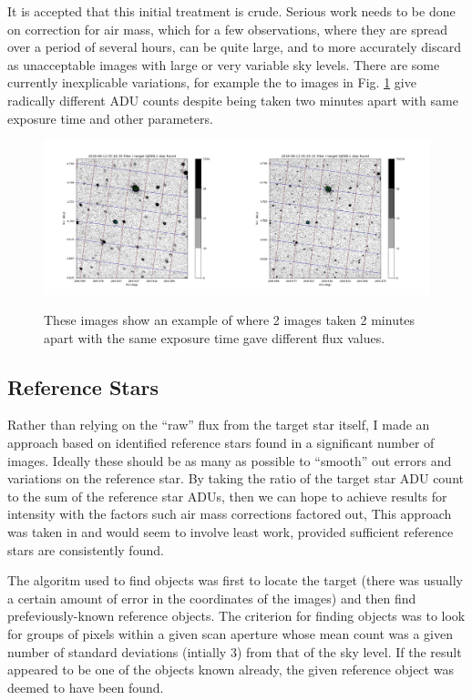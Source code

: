 It is accepted that this initial treatment is crude. Serious work needs to be done on correction for air mass,
which for a few observations, where they are spread over a period of several hours,
can be quite large, and to more accurately discard as unacceptable images with large or very variable sky levels.
There are some currently inexplicable variations, for
example the to images in Fig. \ref{fig:tyeg} give radically different ADU counts despite being taken two minutes apart
with same exposure time and other parameters.

\begin{figure}[!htbp]
\begin{center}
\includegraphics[scale=0.25]{images/tyeg.png}
\end{center}   
\caption{These images show an example of where 2 images taken 2 minutes apart with the same exposure time gave different flux values.}
  \protect\label{fig:tyeg}
\end{figure}

\subsection{Reference Stars}
\protect\label{section:refstars}

Rather than relying on the ``raw'' flux from the target star itself, I made an approach based on identified reference
stars found in a significant number of images. Ideally these should be as many as possible to ``smooth'' out errors and
variations on the reference star. By taking the ratio of the target star ADU count to the sum of the reference star
ADUs, then we can hope to achieve results for intensity with the factors such air mass corrections factored out, This
approach was taken in \citet{berry11} and would seem to involve least work, provided sufficient reference stars are
consistently found.

The algoritm used to find objects was first to locate the target (there was
usually a certain amount of error in the coordinates of the images) and then
find prefeviously-known reference objects. The criterion for finding objects was to look for groups of pixels within a
given scan aperture whose mean count was a given number of standard deviations
(intially 3) from that of the sky level. If the result appeared to be one of
the objects known already, the given reference object was deemed to have been
found.

